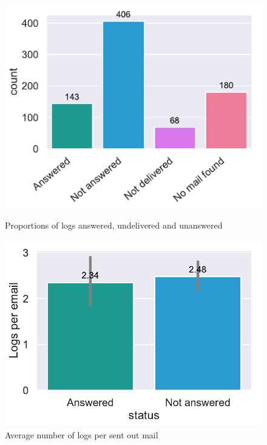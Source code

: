 \documentclass[\myrootdir/main.tex]{subfiles}
\begin{document}
\begin{figure}[htbp]
	\centering
	\begin{minipage}{0.45\textwidth}
		\centering
		\includegraphics[width=\textwidth, clip]{img/dev-mails/answers-received-builds.pdf}
		\caption{Proportions of logs answered, undelivered and unanswered}
		\label{fig:mails-answers-received-builds}
	\end{minipage}\hfill
	\begin{minipage}{0.45\textwidth}
		\centering
		\includegraphics[width=\textwidth, clip]{img/dev-mails/logs-per-mail.pdf}
		\caption{Average number of logs per sent out mail}
		\label{fig:mails-logs-per-mail}
	\end{minipage}
\end{figure}
\end{document}

